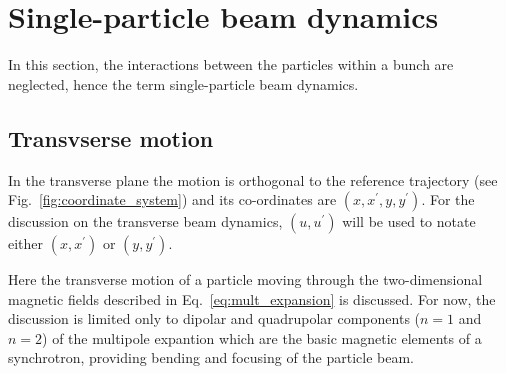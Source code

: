 \section{Single-particle beam dynamics}\label{sec:single_particle_dynamics}
In this section, the interactions between the particles within a bunch are neglected, hence the term single-particle beam dynamics. 






\subsection{Transvserse motion}
In the transverse plane the motion is orthogonal to the reference trajectory (see Fig.~\ref{fig:coordinate_system}) and its co-ordinates are $(x, x^\prime, y, y^\prime)$. For the discussion on the transverse beam dynamics, $(u, u^\prime)$ will be used to notate either $(x, x^\prime)$ or $(y, y^\prime)$.

Here the transverse motion of a particle moving through the two-dimensional magnetic fields described in Eq.~\eqref{eq:mult_expansion} is discussed. For now, the discussion is limited only to dipolar and quadrupolar components ($n=1$ and $n=2$) of the multipole expantion which are the basic magnetic elements of a synchrotron, providing bending and focusing of the particle beam. 


